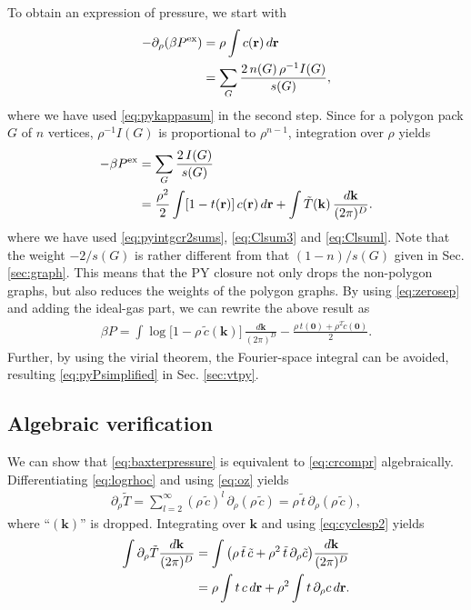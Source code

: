 \documentclass[preprint]{revtex4-1}
\newcommand{\vct}[1]{\mathbf{#1}}
\providecommand{\vr}{} %
\renewcommand{\vr}{\vct{r}}
\newcommand{\vk}{\vct{k}}
\newcommand{\dvk}{\frac{d\vk}{(2\pi)^D}}
\newcommand{\supex}[1]{ { { #1 }^{ \mathrm{ex} } } }
\newcommand{\Pex}{\supex{P}}
\begin{document}
%
To obtain an expression of pressure,
  we start with\cite{hansen}
%
\begin{align}
  -\partial_\rho (\beta \Pex)
  &= \rho \int c(\vr) \, d\vr
  \notag \\
  &= \sum_{G} \frac{ 2 \, n(G) \, \rho^{-1} I(G) }{ s(G) },
\label{eq:crcompr}
\end{align}
where
we have used \eqref{eq:pykappasum} in the second step.
%
%
Since for a polygon pack $G$ of $n$ vertices, $\rho^{-1} I(G)$
  is proportional to $\rho^{n-1}$,
%
integration over $\rho$ yields\cite{baxterpressure}
%
\begin{align}
      -\beta \Pex
  &=  \sum_{G} \frac{ 2 \, I(G) }{ s(G) }
      \notag \\
  &=   \frac{ \rho^2 }{ 2 }
    \int [1 - t(\vr)]\, c(\vr) \, d\vr
      +\int \tilde{T}(\vk) \, \dvk.
\label{eq:baxterpressure}
\end{align}
%
where we have used
\eqref{eq:pyintgcr2sums}, \eqref{eq:Clsum3} and \eqref{eq:Clsuml}.
%
Note that the weight $-2/s(G)$ is rather different
  from that $(1-n)/s(G)$ given in Sec. \ref{sec:graph}.
%
This means that the PY closure not only drops the non-polygon graphs,
  but also reduces the weights of the polygon graphs.
%
By using \eqref{eq:zerosep} and adding the ideal-gas part,
  we can rewrite the above result as
%
\begin{align*}
      \beta P
    =
      \int \log\big[1 - \rho \, \tilde{c}(\vk)\big] \, \dvk
      -\frac{ \rho \, t(\vct{0}) + \rho^2 \tilde{c}(\vct0) }{2}.
\end{align*}
%
Further, by using the virial theorem,
the Fourier-space integral can be avoided,
resulting \eqref{eq:pyPsimplified} in Sec. \ref{sec:vtpy}.



\subsection{Algebraic verification}

We can show that
  \eqref{eq:baxterpressure} is equivalent to \eqref{eq:crcompr}
  algebraically\cite{baxterpressure}.
%
Differentiating \eqref{eq:logrhoc} and using \eqref{eq:oz} yields
%
\begin{align*}
  \partial_\rho \tilde T
=
  \sum_{l = 2}^{\infty}
    ( \rho \, \tilde{c} )^l
    \, \partial_\rho ( \rho \, \tilde{c} )
=
  \rho \, \tilde{t}
  \, \partial_\rho ( \rho \, \tilde{c} ),
\end{align*}
%
where ``$(\vk)$'' is dropped.
%
Integrating over $\vk$ and using \eqref{eq:cyclesp2} yields
%
\begin{align}
  \int \partial_\rho \tilde T \dvk
&=
  \int
    \big(
      \rho \, \tilde{t} \, \tilde{c}
      +
      \rho^2 \, \tilde{t} \, \partial_\rho \tilde{c}
    \big) \dvk
\notag \\
&=
  \rho \int t \, c \, d\vr
      +
  \rho^2 \int t \, \partial_\rho c \, d\vr.
\label{eq:intdlogrhoc}
\end{align}
\end{document}
